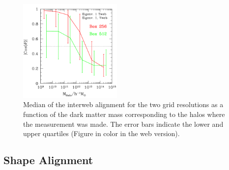 \documentclass[usenatbib]{mn2e}
\begin{document}

\begin{figure}
\includegraphics[width=0.45\textwidth]{../plot2/Mass/Web.pdf}
\caption{Median of the interweb alignment for the two grid
  resolutions as a function of the dark matter mass corresponding to
  the halos where the measurement was made. The error bars indicate
  the lower and upper quartiles (Figure in color in the web version).} 
\end{figure}


\subsection{Shape Alignment}
\end{document}
